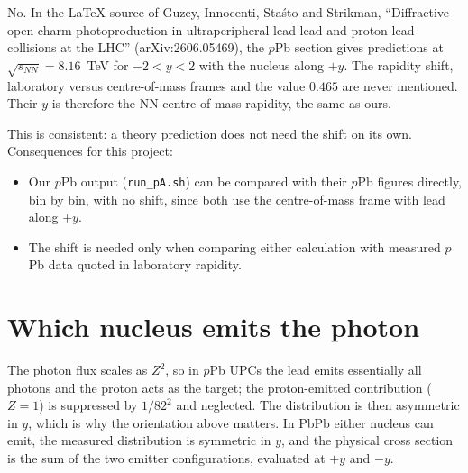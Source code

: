 \documentclass[11pt]{article}
\begin{document}
No. In the LaTeX source of Guzey, Innocenti, Sta\'sto and Strikman,
``Diffractive open charm photoproduction in ultraperipheral lead-lead and
proton-lead collisions at the LHC'' (arXiv:2606.05469), the $p$Pb section
gives predictions at $\sqrt{s_{NN}}=8.16$~TeV for $-2<y<2$ with the nucleus
along $+y$. The rapidity shift, laboratory versus centre-of-mass frames and
the value $0.465$ are never mentioned. Their $y$ is therefore the NN
centre-of-mass rapidity, the same as ours.

This is consistent: a theory prediction does not need the shift on its own.
Consequences for this project:
\begin{itemize}
  \item Our $p$Pb output (\texttt{run\_pA.sh}) can be compared with their
    $p$Pb figures directly, bin by bin, with no shift, since both use the
    centre-of-mass frame with lead along $+y$.
  \item The shift is needed only when comparing either calculation with
    measured $p$Pb data quoted in laboratory rapidity.
\end{itemize}

\section{Which nucleus emits the photon}

The photon flux scales as $Z^2$, so in $p$Pb UPCs the lead emits essentially
all photons and the proton acts as the target; the proton-emitted
contribution ($Z=1$) is suppressed by $1/82^2$ and neglected. The
distribution is then asymmetric in $y$, which is why the orientation above
matters. In PbPb either nucleus can emit, the measured distribution is
symmetric in $y$, and the physical cross section is the sum of the two
emitter configurations, evaluated at $+y$ and $-y$.
\end{document}
